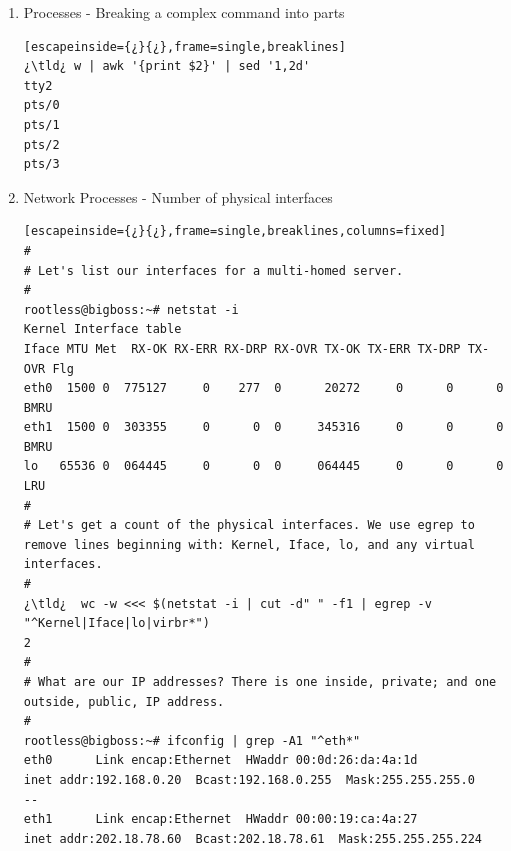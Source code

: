 \begin{enumerate}
\begin{lstlisting}[escapeinside={¿}{¿},frame=single,breaklines]
two sock


three sock


sock one


three socks
#
# Insert a blank line using awk.
#
¿\tld¿ awk '1;{print ""}' my.dblspc.file 
one sock

two sock

three sock

sock one

three socks
#
# Insert two blank lines after each line.
#
¿\tld¿ awk '1;{print ""};{print ""}' my.dblspc.file 
one sock


two sock


three sock


sock one


three socks



\end{lstlisting}

\item\hypertarget{sedel}{Processes - Breaking a complex command into parts}
\begin{lstlisting}[escapeinside={¿}{¿},frame=single,breaklines]
¿\tld¿ w | awk '{print $2}' | sed '1,2d'
tty2
pts/0
pts/1
pts/2
pts/3
\end{lstlisting}
	
\item\hypertarget{numints}{Network Processes - Number of physical interfaces}
\begin{lstlisting}[escapeinside={¿}{¿},frame=single,breaklines,columns=fixed]
#
# Let's list our interfaces for a multi-homed server.	
#
rootless@bigboss:~# netstat -i
Kernel Interface table
Iface MTU Met  RX-OK RX-ERR RX-DRP RX-OVR TX-OK TX-ERR TX-DRP TX-OVR Flg
eth0  1500 0  775127     0    277  0      20272     0      0      0 BMRU
eth1  1500 0  303355     0      0  0     345316     0      0      0 BMRU
lo   65536 0  064445     0      0  0     064445     0      0      0 LRU
#
# Let's get a count of the physical interfaces. We use egrep to remove lines beginning with: Kernel, Iface, lo, and any virtual interfaces.
#
¿\tld¿  wc -w <<< $(netstat -i | cut -d" " -f1 | egrep -v "^Kernel|Iface|lo|virbr*")
2
#
# What are our IP addresses? There is one inside, private; and one outside, public, IP address.
#
rootless@bigboss:~# ifconfig | grep -A1 "^eth*"
eth0      Link encap:Ethernet  HWaddr 00:0d:26:da:4a:1d  
inet addr:192.168.0.20  Bcast:192.168.0.255  Mask:255.255.255.0
--
eth1      Link encap:Ethernet  HWaddr 00:00:19:ca:4a:27  
inet addr:202.18.78.60  Bcast:202.18.78.61  Mask:255.255.255.224

\end{lstlisting}
	
\end{enumerate}